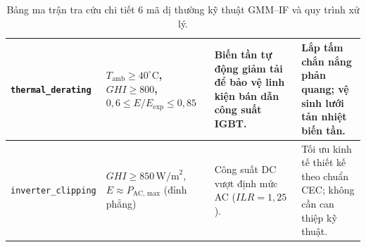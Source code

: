 \documentclass[12pt, a4paper]{report}
\begin{document}
\begin{table}[H]
\begin{tabularx}{\textwidth}{@{} >{\raggedright\arraybackslash}p{2.6cm} >{\raggedright\arraybackslash}p{3.4cm} >{\raggedright\arraybackslash}X >{\raggedright\arraybackslash}X @{}}
\midrule
\texttt{thermal\_}\newline\texttt{derating} & $T_{\text{amb}} \ge 40^\circ\text{C}$, $GHI \ge 800$,\newline $0{,}6 \le E/E_{\text{exp}} \le 0{,}85$ & Biến tần tự động giảm tải để bảo vệ linh kiện bán dẫn công suất IGBT. & Lắp tấm chắn nắng phản quang; vệ sinh lưới tản nhiệt biến tần. \\
\midrule
\texttt{inverter\_}\newline\texttt{clipping} & $GHI \ge 850\,\text{W/m}^2$,\newline $E \approx P_{\text{AC, max}}$ (đỉnh phẳng) & Công suất DC vượt định mức AC ($ILR = 1{,}25$). & Tối ưu kinh tế thiết kế theo chuẩn CEC; không cần can thiệp kỹ thuật. \\
\bottomrule
\end{tabularx}
\caption{Bảng ma trận tra cứu chi tiết 6 mã dị thường kỹ thuật GMM--IF và quy trình xử lý.}
\label{tab:outlier_matrix_detail}
\end{table}
\end{document}
